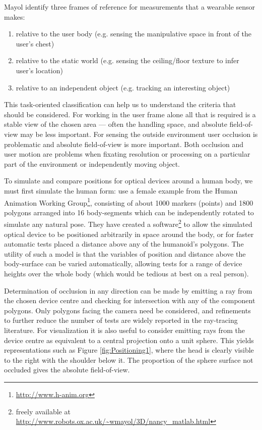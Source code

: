 Mayol \etal \cite{mayol2001positioning} identify three frames of reference for measurements that a wearable sensor makes: 
\begin{enumerate}
\item relative to the user body (e.g. sensing the manipulative space in front of the user’s chest)
\item relative to the static world (e.g. sensing the ceiling/floor texture to infer user’s location)
\item relative to an independent object (e.g. tracking an interesting object)
\end{enumerate}
This task-oriented classification can help us to understand the criteria that should be considered. For working in the user frame alone all that is required is a stable view of the chosen area — often the handling space, and absolute field-of-view may be less important. For sensing the outside environment user occlusion is problematic and absolute field-of-view is more important. Both occlusion and
user motion are problems when fixating resolution or processing on a particular part of the environment or independently moving object.

To simulate and compare positions for optical devices around a human body, we must first simulate the human form: \cite{mayol2001positioning} use a female example from the Human Animation Working Group\footnote{\url{http://www.h-anim.org}}, consisting of about 1000 markers (points) and 1800 polygons arranged into 16 body-segments which can be independently rotated to simulate any natural pose. They have created a software\footnote{freely available at \url{http://www.robots.ox.ac.uk/~wmayol/3D/nancy_matlab.html}} to allow the simulated optical device to be positioned arbitrarily in space around the body, or for faster automatic tests placed a distance above any of the humanoid’s polygons. The utility of such a model is that the variables of position and distance above the body-surface can be varied automatically, allowing tests for a range of device heights over the whole body (which would be tedious at best on a real person).

Determination of occlusion in any direction can be made by emitting a ray from the chosen device centre and checking for intersection with any of the component polygons. Only polygons facing the camera need be considered, and refinements to further reduce the number of tests are widely reported in the ray-tracing literature. For visualization it is also useful to consider emitting rays from the device centre as equivalent to a central projection onto a unit sphere. This yields representations such as Figure \ref{fig:Positioning1}, where
the head is clearly visible to the right with the shoulder below it. The proportion of the sphere surface not occluded gives the absolute field-of-view.


